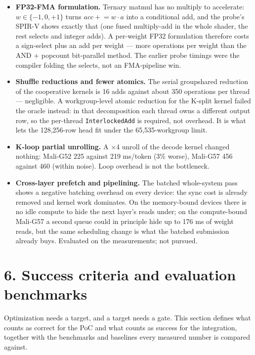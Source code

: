 \documentclass[
  10pt,
]{article}
\providecommand{\tightlist}{%
  \setlength{\itemsep}{0pt}\setlength{\parskip}{0pt}}
\begin{document}
\begin{itemize}
\tightlist%
\item
  \textbf{FP32-FMA formulation.} Ternary matmul has no multiply to
  accelerate: $w\in\{-1,0,+1\}$ turns $acc \mathrel{+}= w\cdot a$ into a
  conditional add, and the probe's SPIR-V shows exactly that (one fused
  multiply-add in the whole shader, the rest selects and integer adds).
  A per-weight FP32 formulation therefore costs a sign-select plus an
  add per weight --- more operations per weight than the AND + popcount
  bit-parallel method. The earlier probe timings were the compiler
  folding the selects, not an FMA-pipeline win.
\item
  \textbf{Shuffle reductions and fewer atomics.} The serial groupshared
  reduction of the cooperative kernels is 16 adds against about 350
  operations per thread --- negligible. A workgroup-level atomic
  reduction for the K-split kernel failed the oracle instead: in that
  decomposition each thread owns a different output row, so the
  per-thread \texttt{InterlockedAdd} is required, not overhead. It is
  what lets the 128,256-row head fit under the 65,535-workgroup limit.
\item
  \textbf{K-loop partial unrolling.} A $\times$4 unroll of the decode
  kernel changed nothing: Mali-G52 225 against 219 ms/token (3\%
  worse), Mali-G57 456 against 460 (within noise). Loop overhead is not
  the bottleneck.
\item
  \textbf{Cross-layer prefetch and pipelining.} The batched whole-system
  pass shows a negative batching overhead on every device: the sync
  cost is already removed and kernel work dominates. On the
  memory-bound devices there is no idle compute to hide the next
  layer's reads under; on the compute-bound Mali-G57 a second queue
  could in principle hide up to 176 ms of weight reads, but the same
  scheduling change is what the batched submission already buys.
  Evaluated on the measurements; not pursued.
\end{itemize}

\section{6. Success criteria and evaluation
benchmarks}\label{success-criteria-and-evaluation-benchmarks}

Optimization needs a target, and a target needs a gate. This section
defines what counts as correct for the PoC and what counts as success
for the integration, together with the benchmarks and baselines every
measured number is compared against.
\end{document}
